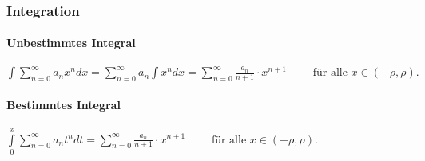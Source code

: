 \subsubsection{Integration}
 \paragraph{Unbestimmtes Integral}
$\int \sum\limits_{n=0}^{\infty} a_n x^n dx = 
\sum\limits_{n=0}^{\infty} a_n \int x^n dx = 
\sum\limits_{n=0}^{\infty} \frac{a_n}{n+1}\cdot x^{n+1} \qquad \text{ für alle } x \in (-\rho, \rho).$
\paragraph{Bestimmtes Integral}
$\int\limits_0^x \sum\limits_{n=0}^{\infty} a_n t^n dt = 
\sum\limits_{n=0}^{\infty} \frac{a_n}{n+1}\cdot x^{n+1} \qquad \text{ für alle } x \in (-\rho, \rho).$
